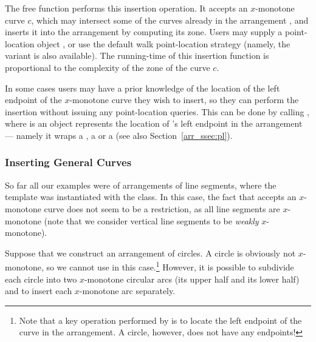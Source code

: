 The free function  performs
this insertion operation. It accepts an $x$-monotone curve $c$,
which may intersect some of the curves already in the arrangement
, and inserts it into the arrangement by computing its zone.
Users may supply a point-location object , or use the default
walk point-location strategy (namely, the variant
 is also available). The
running-time of this insertion function is proportional to the
complexity of the zone of the curve $c$.

\begin{ccAdvanced}
In some cases users may have a prior knowledge of the location of the
left endpoint of the $x$-monotone curve  they wish to insert,
so they can perform the insertion without issuing any point-location
queries. This can be done by calling
, where  is an
object represents the location of 's left endpoint in the
arrangement --- namely it wraps a , a
 or a  (see
also Section~\ref{arr_ssec:pl}).
\end{ccAdvanced}

\subsubsection{Inserting General Curves\label{arr_sssec:insert_gen}}

So far all our examples were of arrangements of line segments,
where the  template was instantiated with the
 class. In this case, the fact that
 accepts an $x$-monotone curve does not
seem to be a restriction, as all line segments are $x$-monotone
(note that we consider vertical line segments to be {\em weakly}
$x$-monotone).

Suppose that we construct an arrangement of circles. A circle is
obviously not $x$-monotone, so we cannot use
 in this case.\footnote{Note that a key
operation performed by  is to locate the
left endpoint of the curve in the arrangement. A circle, however, does
not have any endpoints!} However, it is possible to subdivide each circle
into two $x$-monotone circular arcs (its upper half and its lower
half) and to insert each $x$-monotone arc separately.

